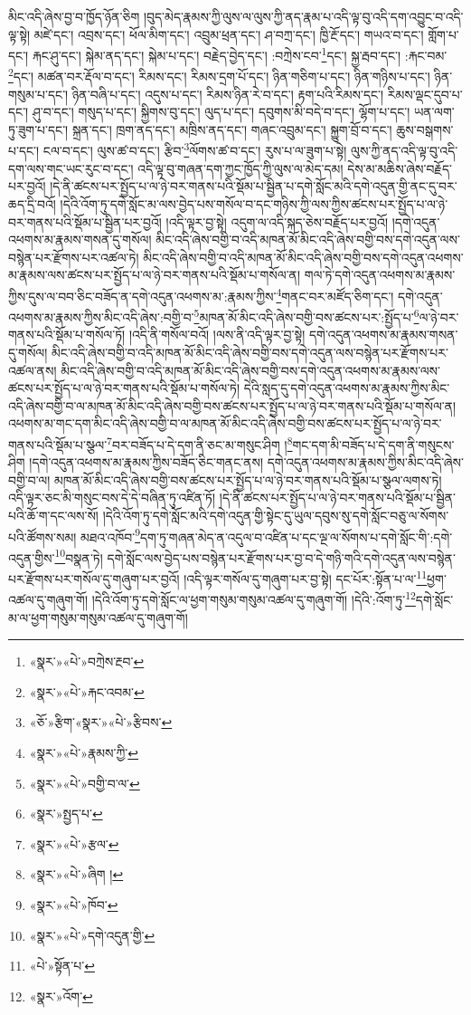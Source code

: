 མིང་འདི་ཞེས་བྱ་བ་ཁྱོད་ཉོན་ཅིག །བུད་མེད་རྣམས་ཀྱི་ལུས་ལ་ལུས་ཀྱི་ནད་རྣམ་པ་འདི་ལྟ་བུ་འདི་དག་འབྱུང་བ་འདི་ལྟ་སྟེ། མཛེ་དང་། འབྲས་དང་། ཕོལ་མིག་དང་། འབྲུམ་ཕྲན་དང་། ཤ་བཀྲ་དང་། ཁྱི་རྔོ་དང་། གཡའ་བ་དང་། གློག་པ་དང་། རྐང་ཤུ་དང་། སྐེམ་ནད་དང་། སྐེམ་པ་དང་། བརྗེད་བྱེད་དང་། :བཀྲེས་ངབ་\footnote{«སྣར་»«པེ་»བཀྲེས་རྔབ་}དང་། སྐྱ་རྦབ་དང་། :རྐང་བམ་\footnote{«སྣར་»«པེ་»རྐང་འབམ་}དང་། མཚན་བར་རྡོལ་བ་དང་། རིམས་དང་། རིམས་དྲག་པོ་དང་། ཉིན་གཅིག་པ་དང་། ཉིན་གཉིས་པ་དང་། ཉིན་གསུམ་པ་དང་། ཉིན་བཞི་པ་དང་། འདུས་པ་དང་། རིམས་ཉིན་རེ་བ་དང་། རྟག་པའི་རིམས་དང་། རིམས་ལྡང་དུབ་པ་དང་། ཤུ་བ་དང་། གསུད་པ་དང་། སྐྱིགས་བུ་དང་། ལུད་པ་དང་། དབུགས་མི་བདེ་བ་དང་། ལྷོག་པ་དང་། ཡན་ལག་ཏུ་ཟུག་པ་དང་། སྐྲན་དང་། ཁྲག་ནད་དང་། མཁྲིས་ནད་དང་། གཞང་འབྲུམ་དང་། སྐྱུག་བྲོ་བ་དང་། ཆུས་བསྒགས་པ་དང་། ངལ་བ་དང་། ལུས་ཚ་བ་དང་། རྩིབ་\footnote{«ཅོ་»རྩིག་«སྣར་»«པེ་»རྩིབས་}ལོགས་ཚ་བ་དང་། རུས་པ་ལ་ཟུག་པ་སྟེ། ལུས་ཀྱི་ནད་འདི་ལྟ་བུ་འདི་དག་ལས་གང་ཡང་རུང་བ་དང་། འདི་ལྟ་བུ་གཞན་དག་ཀྱང་ཁྱོད་ཀྱི་ལུས་ལ་མེད་དམ། དེས་མ་མཆིས་ཞེས་བརྗོད་པར་བྱའོ། །དེ་ནི་ཚངས་པར་སྤྱོད་པ་ལ་ཉེ་བར་གནས་པའི་སྡོམ་པ་སྦྱིན་པ་དགེ་སློང་མའི་དགེ་འདུན་གྱི་ནང་དུ་བར་ཆད་དྲི་བའོ། །དེའི་འོག་ཏུ་དགེ་སློང་མ་ལས་བྱེད་པས་གསོལ་བ་དང་གཉིས་ཀྱི་ལས་ཀྱིས་ཚངས་པར་སྤྱོད་པ་ལ་ཉེ་བར་གནས་པའི་སྡོམ་པ་སྦྱིན་པར་བྱའོ། །འདི་ལྟར་བྱ་སྟེ། འདུག་ལ་འདི་སྐད་ཅེས་བརྗོད་པར་བྱའོ། །དགེ་འདུན་འཕགས་མ་རྣམས་གསན་དུ་གསོལ། མིང་འདི་ཞེས་བགྱི་བ་འདི་མཁན་མོ་མིང་འདི་ཞེས་བགྱི་བས་དགེ་འདུན་ལས་བསྙེན་པར་རྫོགས་པར་འཚལ་ཏེ། མིང་འདི་ཞེས་བགྱི་བ་འདི་མཁན་མོ་མིང་འདི་ཞེས་བགྱི་བས་དགེ་འདུན་འཕགས་མ་རྣམས་ལས་ཚངས་པར་སྤྱོད་པ་ལ་ཉེ་བར་གནས་པའི་སྡོམ་པ་གསོལ་ན། གལ་ཏེ་དགེ་འདུན་འཕགས་མ་རྣམས་ཀྱིས་དུས་ལ་བབ་ཅིང་བཟོད་ན་དགེ་འདུན་འཕགས་མ་:རྣམས་ཀྱིས་\footnote{«སྣར་»«པེ་»རྣམས་ཀྱི་}གནང་བར་མཛོད་ཅིག་དང་། དགེ་འདུན་འཕགས་མ་རྣམས་ཀྱིས་མིང་འདི་ཞེས་:བགྱི་བ་\footnote{«སྣར་»«པེ་»བགྱི་བ་ལ་}མཁན་མོ་མིང་འདི་ཞེས་བགྱི་བས་ཚངས་པར་:སྤྱོད་པ་\footnote{«སྣར་»སྤྱད་པ་}ལ་ཉེ་བར་གནས་པའི་སྡོམ་པ་གསོལ་ཏོ། །འདི་ནི་གསོལ་བའོ། །ལས་ནི་འདི་ལྟར་བྱ་སྟེ། དགེ་འདུན་འཕགས་མ་རྣམས་གསན་དུ་གསོལ། མིང་འདི་ཞེས་བགྱི་བ་འདི་མཁན་མོ་མིང་འདི་ཞེས་བགྱི་བས་དགེ་འདུན་ལས་བསྙེན་པར་རྫོགས་པར་འཚལ་ནས། མིང་འདི་ཞེས་བགྱི་བ་འདི་མཁན་མོ་མིང་འདི་ཞེས་བགྱི་བས་དགེ་འདུན་འཕགས་མ་རྣམས་ལས་ཚངས་པར་སྤྱོད་པ་ལ་ཉེ་བར་གནས་པའི་སྡོམ་པ་གསོལ་ཏེ། དེའི་སླད་དུ་དགེ་འདུན་འཕགས་མ་རྣམས་ཀྱིས་མིང་འདི་ཞེས་བགྱི་བ་ལ་མཁན་མོ་མིང་འདི་ཞེས་བགྱི་བས་ཚངས་པར་སྤྱོད་པ་ལ་ཉེ་བར་གནས་པའི་སྡོམ་པ་གསོལ་ན། འཕགས་མ་གང་དག་མིང་འདི་ཞེས་བགྱི་བ་ལ་མཁན་མོ་མིང་འདི་ཞེས་བགྱི་བས་ཚངས་པར་སྤྱོད་པ་ལ་ཉེ་བར་གནས་པའི་སྡོམ་པ་སྩལ་\footnote{«སྣར་»«པེ་»རྩལ་}བར་བཟོད་པ་དེ་དག་ནི་ཅང་མ་གསུང་ཤིག །\footnote{«སྣར་»«པེ་»ཞིག །}གང་དག་མི་བཟོད་པ་དེ་དག་ནི་གསུངས་ཤིག །དགེ་འདུན་འཕགས་མ་རྣམས་ཀྱིས་བཟོད་ཅིང་གནང་ནས། དགེ་འདུན་འཕགས་མ་རྣམས་ཀྱིས་མིང་འདི་ཞེས་བགྱི་བ་ལ། མཁན་མོ་མིང་འདི་ཞེས་བགྱི་བས་ཚངས་པར་སྤྱོད་པ་ལ་ཉེ་བར་གནས་པའི་སྡོམ་པ་སྩལ་ལགས་ཏེ། འདི་ལྟར་ཅང་མི་གསུང་བས་དེ་དེ་བཞིན་ཏུ་འཛིན་ཏོ། །དེ་ནི་ཚངས་པར་སྤྱོད་པ་ལ་ཉེ་བར་གནས་པའི་སྡོམ་པ་སྦྱིན་པའི་ཆོ་ག་དང་ལས་སོ། །དེའི་འོག་ཏུ་དགེ་སློང་མའི་དགེ་འདུན་གྱི་སྟེང་དུ་ཡུལ་དབུས་སུ་དགེ་སློང་བཅུ་ལ་སོགས་པའི་ཚོགས་སམ། མཐའ་འཁོབ་\footnote{«སྣར་»«པེ་»ཁོབ་}དག་ཏུ་གཞན་མེད་ན་འདུལ་བ་འཛིན་པ་དང་ལྔ་ལ་སོགས་པ་དགེ་སློང་གི་:དགེ་འདུན་གྱིས་\footnote{«སྣར་»«པེ་»དགེ་འདུན་གྱི་}བསྣན་ཏེ། དགེ་སློང་ལས་བྱེད་པས་བསྙེན་པར་རྫོགས་པར་བྱ་བ་དེ་གཉི་གའི་དགེ་འདུན་ལས་བསྙེན་པར་རྫོགས་པར་གསོལ་དུ་གཞུག་པར་བྱའོ། །འདི་ལྟར་གསོལ་དུ་གཞུག་པར་བྱ་སྟེ། དང་པོར་:སྟོན་པ་ལ་\footnote{«པེ་»སྟོན་པ་}ཕྱག་འཚལ་དུ་གཞུག་གོ། །དེའི་འོག་ཏུ་དགེ་སློང་ལ་ཕྱག་གསུམ་གསུམ་འཚལ་དུ་གཞུག་གོ། །དེའི་:འོག་ཏུ་\footnote{«སྣར་»འོག་}དགེ་སློང་མ་ལ་ཕྱག་གསུམ་གསུམ་འཚལ་དུ་གཞུག་གོ། 
